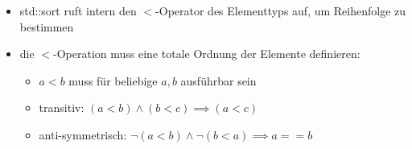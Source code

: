 \documentclass[a4paper]{scrartcl}
\theoremstyle{definition}
\theoremstyle{plain}
\theoremstyle{remark}
\theoremstyle{remark}
\begin{document}
\begin{itemize}
\begin{itemize}
\begin{itemize}
\item std::sort ruft intern den $<$-Operator des Elementtyps auf, um Reihenfolge zu bestimmen
\item die $<$-Operation muss eine totale Ordnung der Elemente definieren:
\begin{itemize}
\item $a < b$ muss für beliebige $a,b$ ausführbar sein
\item transitiv: $(a < b) \wedge (b < c) \implies (a < c)$
\item anti-symmetrisch: $\neg(a < b) \wedge \neg(b < a) \implies a == b$
\end{itemize}
\end{itemize}
\end{itemize}
\end{itemize}
\end{document}
